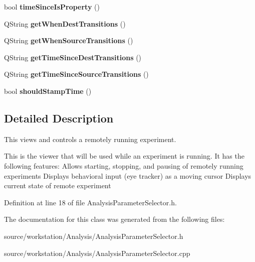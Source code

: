 \begin{DoxyCompactItemize}
\item 
\hypertarget{class_analysis_parameter_selector_af61d47aee087fcbc7c0cd71959b8f6ba}{bool {\bfseries time\-Since\-Is\-Property} ()}\label{class_analysis_parameter_selector_af61d47aee087fcbc7c0cd71959b8f6ba}

\item 
\hypertarget{class_analysis_parameter_selector_ac151916d55fc9b2a2a0de423ede810a3}{Q\-String {\bfseries get\-When\-Dest\-Transitions} ()}\label{class_analysis_parameter_selector_ac151916d55fc9b2a2a0de423ede810a3}

\item 
\hypertarget{class_analysis_parameter_selector_aebf7fd823601c0f638cce7ae86e86ebe}{Q\-String {\bfseries get\-When\-Source\-Transitions} ()}\label{class_analysis_parameter_selector_aebf7fd823601c0f638cce7ae86e86ebe}

\item 
\hypertarget{class_analysis_parameter_selector_a5973e2aa4d9006cc2fec8d769dc89bcc}{Q\-String {\bfseries get\-Time\-Since\-Dest\-Transitions} ()}\label{class_analysis_parameter_selector_a5973e2aa4d9006cc2fec8d769dc89bcc}

\item 
\hypertarget{class_analysis_parameter_selector_a461d71c79d163aa0816996852ffd331c}{Q\-String {\bfseries get\-Time\-Since\-Source\-Transitions} ()}\label{class_analysis_parameter_selector_a461d71c79d163aa0816996852ffd331c}

\item 
\hypertarget{class_analysis_parameter_selector_a20bba4f6b093b64c7982c3d7a26f8f88}{bool {\bfseries should\-Stamp\-Time} ()}\label{class_analysis_parameter_selector_a20bba4f6b093b64c7982c3d7a26f8f88}

\end{DoxyCompactItemize}


\subsection{Detailed Description}
This views and controls a remotely running experiment. 

This is the viewer that will be used while an experiment is running. It has the following features\-: Allows starting, stopping, and pausing of remotely running experiments Displays behavioral input (eye tracker) as a moving cursor Displays current state of remote experiment 

Definition at line 18 of file Analysis\-Parameter\-Selector.\-h.



The documentation for this class was generated from the following files\-:\begin{DoxyCompactItemize}
\item 
source/workstation/\-Analysis/Analysis\-Parameter\-Selector.\-h\item 
source/workstation/\-Analysis/Analysis\-Parameter\-Selector.\-cpp\end{DoxyCompactItemize}

